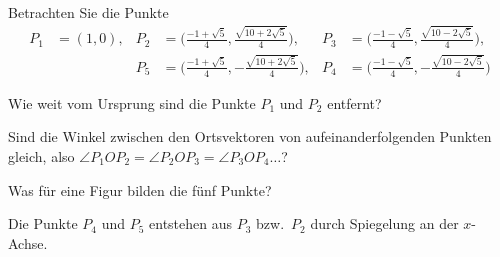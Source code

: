 Betrachten Sie die Punkte
\begin{align*}
P_1&=(1,0),
&P_2&=\biggl(\frac{-1+\sqrt{5}}4, \frac{\sqrt{10+2\sqrt{5}}}4 \biggr),
&P_3&=\biggl(\frac{-1-\sqrt{5}}4, \frac{\sqrt{10-2\sqrt{5}}}4 \biggr),\\
&&P_5&=\biggl(\frac{-1+\sqrt{5}}4,-\frac{\sqrt{10+2\sqrt{5}}}4 \biggr),
&P_4&=\biggl(\frac{-1-\sqrt{5}}4,-\frac{\sqrt{10-2\sqrt{5}}}4 \biggr)
\end{align*}
\begin{teilaufgaben}
\item Wie weit vom Ursprung sind die Punkte $P_1$ und $P_2$ 
entfernt?
\item Sind die Winkel zwischen den Ortsvektoren von aufeinanderfolgenden
Punkten gleich, also $\angle P_1OP_2=\angle P_2OP_3=\angle P_3OP_4\dots$?
\item Was für eine Figur bilden die fünf Punkte?
\end{teilaufgaben}

\begin{hinweis}
Die Punkte $P_4$ und $P_5$ entstehen aus $P_3$ bzw.~$P_2$ durch
Spiegelung an der $x$-Achse.
\end{hinweis}

